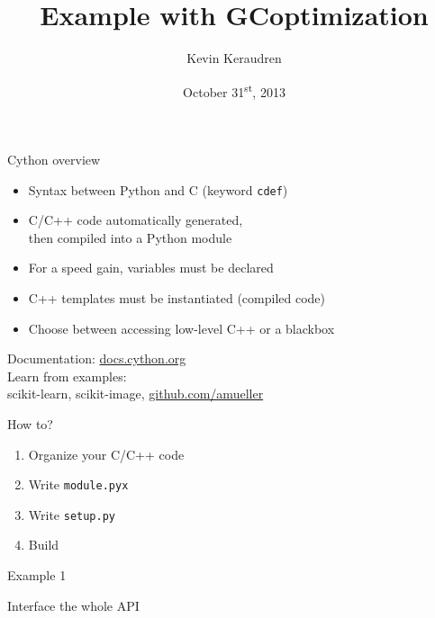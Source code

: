 \documentclass[12pt]{beamer}
\title[]{Example with GCoptimization}
\author[K. Keraudren]{Kevin Keraudren}
\date{October 31\textsuperscript{st}, 2013}
\institute[ICL]{Imperial College London}
\begin{document}
\begin{frame}[plain]
	\titlepage
\end{frame}


\begin{frame}{Cython overview}

\begin{itemize}
\item Syntax between Python and C (keyword \texttt{cdef})
\item C/C++ code automatically generated,\\
 then compiled into a Python module
\item For a speed gain, variables must be declared
\item C++ templates must be instantiated (compiled code)
\item Choose between accessing low-level C++ or a blackbox
\end{itemize}

\begin{center}
Documentation: \url{docs.cython.org}\\
\vspace{0.02\textheight}
Learn from examples:\\
scikit-learn, scikit-image, \url{github.com/amueller}
\end{center}
\end{frame}

\begin{frame}{How to?}
\begin{enumerate}
\item Organize your C/C++ code
\item Write \texttt{module.pyx}
\item Write \texttt{setup.py}
\item Build
\end{enumerate}
\end{frame}

\begin{frame}
\begin{center}
\LARGE
\textcolor{specialblue}{Example 1}

\Large

\vspace{0.1\textheight}

Interface the whole API
\end{center}
\end{frame}
\end{document}
